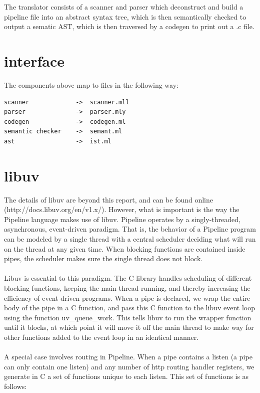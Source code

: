\documentclass[./Report_main.tex]{subfiles}
\begin{document}
The translator consists of a scanner and parser which deconstruct and build a pipeline file into an abstract syntax tree, which is then semantically checked to output a sematic AST, which is then
traversed by a codegen to print out a .c file.
\section{interface}
The components above map to files in the following way:\\
\begin{verbatim}
scanner             ->  scanner.mll
parser              ->  parser.mly
codegen             ->  codegen.ml
semantic checker    ->  semant.ml
ast                 ->  ist.ml
\end{verbatim}

\section{libuv}
The details of libuv are beyond this report, and can be found online (http://docs.libuv.org/en/v1.x/). However, what is important is the way the Pipeline language makes use of libuv. Pipeline operates by a singly-threaded, asynchronous, event-driven paradigm. That is, the behavior of a Pipeline program can be modeled by a single thread with a central scheduler deciding what will run on the thread at any given time. When blocking functions are contained inside pipes, the scheduler
makes sure the single thread does not block.\\\\
Libuv is essential to this paradigm. The C library handles scheduling of different blocking functions, keeping the main thread running, and thereby increasing the efficiency of event-driven programs. When a pipe is declared, we wrap the entire body of the pipe in a C function, and pass this C function to the libuv event loop using the function uv\_queue\_work. This tells libuv to run the wrapper function until it blocks, at which point it will move it off the main thread to make way
for other functions added to the event loop in an identical manner.\\\\
A special case involves routing in Pipeline. When a pipe contains a listen (a pipe can only contain one listen) and any number of http routing handler registers, we generate in C a set of functions unique to each listen. This set of functions is as follows:\\\\
\end{document}
